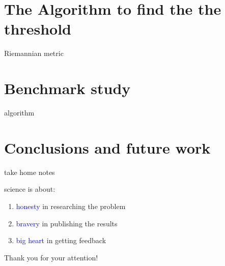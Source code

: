 \documentclass[10pt]{beamer}
\begin{document}
\section{The Algorithm to find the the threshold}


\begin{frame}{Riemannian metric}
\end{frame}


\section{Benchmark study}

\begin{frame}{algorithm}
    
\end{frame}



\section{Conclusions and future work}

\begin{frame}{take home notes}

\begin{center}science is about:\end{center}

\begin{center}
\begin{enumerate}
	\item \textcolor{blue}{honesty} in researching the problem
	\item \textcolor{blue}{bravery} in publishing the results 
    \item \textcolor{blue}{big heart} in getting feedback 
\end{enumerate}
\end{center}
\end{frame}

\begin{frame}[standout]
\begin{center}
Thank you for your attention!
\end{center}
\end{frame}
\end{document}
